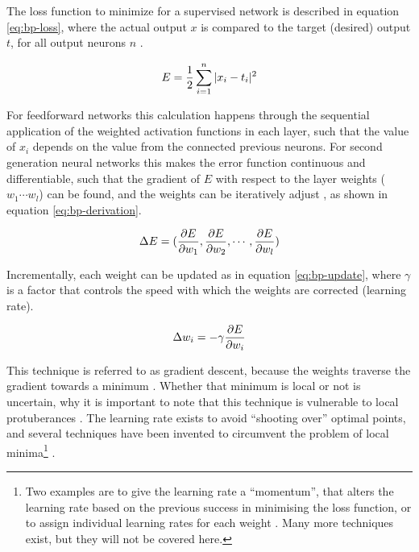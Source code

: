 \documentclass[report.tex]{subfiles}
\begin{document}
The loss function to minimize for a supervised network
is described in equation \ref{eq:bp-loss},
where the actual output $x$ is compared to the 
target (desired) output $t$, for all output neurons $n$
\cite{Russel2007}.

\begin{equation}
  E = {1 \over 2} \sum_{i=1}^n |x_i - t_i|^2
  \label{eq:bp-loss}
\end{equation}

For feedforward networks this calculation happens
through the sequential application of the weighted activation
functions in each layer, such that the value of $x_i$
depends on the value from the connected previous neurons.
For second generation neural networks this makes the
error function continuous and differentiable,
such that the gradient of $E$ with respect to the layer weights
($w_1 \cdots w_l$) can be found, and the weights can be iteratively
adjust \cite{Rojas1996}, as shown in equation \ref{eq:bp-derivation}.

\begin{equation}
  \Delta E = (
    {\partial E \over \partial w_1}, 
    {\partial E \over \partial w_2},
    \cdots, 
    {\partial E \over \partial w_l}
  )
  \label{eq:bp-derivation}
\end{equation}

Incrementally, each weight can be updated as in equation \ref{eq:bp-update},
where $\gamma$ is a factor that controls the speed with which the weights
are corrected (learning rate). 

\begin{equation}
  \Delta w_i = -\gamma {\partial E \over \partial w_i}
  \label{eq:bp-update}
\end{equation}

This technique is referred to as gradient descent, because the weights
traverse the gradient towards a minimum \cite{Russel2007}.
Whether that minimum is local or not is uncertain, why it is
important to note that this technique is vulnerable to 
local protuberances \cite{Rojas1996, Russel2007}.
The learning rate exists to avoid ``shooting over'' optimal points, and
several techniques have been invented to circumvent the problem of 
local minima\footnote{Two examples are to give the learning rate a
  ``momentum'', that alters the learning rate based on the previous 
  success in minimising the loss function, 
  or to assign individual learning rates for each weight
  \cite{Schmidhuber2014}. Many more techniques exist, but they will
  not be covered here.
} \cite{Russel2007}.
\end{document}
